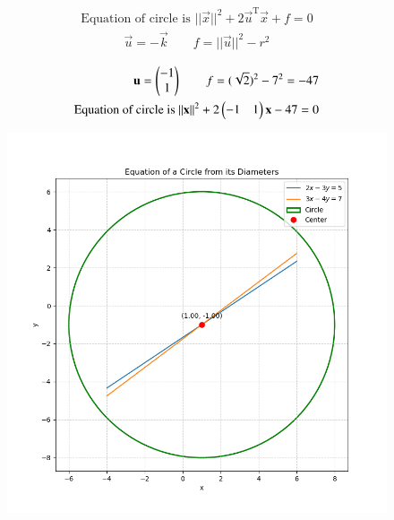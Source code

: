 \documentclass[journal]{IEEEtran}
\begin{document}
\begin{align}
    \text{Equation of circle is }||\vec{x}||^2 + 2\vec{u}^{\text{T}}\vec{x} + f = 0
\end{align}
\begin{align}
    \vec{u}=-\vec{k} \qquad f =||\vec{u}||^2 - r^2 
\end{align}

\begin{align}
    \mathbf{u}=\begin{pmatrix}-1\\1\end{pmatrix} \qquad f=(\sqrt{2})^2 - 7^2 = -47\\
     \text{Equation of circle is }||\mathbf{x}||^2 + 2\begin{pmatrix}-1&1\end{pmatrix}\mathbf{x} -47 = 0
\end{align}


\begin{figure}[H]
    \centering
    \includegraphics[width=0.8\linewidth]{figs/circle.png}
    \caption{}
    \label{fig:placeholder}
\end{figure}
\end{document}
